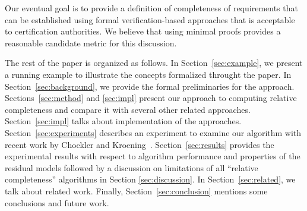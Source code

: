 \noindent Our eventual goal is to provide a definition of completeness of requirements that can be established using formal verification-based approaches that is acceptable to certification authorities.  We believe that using minimal proofs provides a reasonable candidate metric for this discussion.


The rest of the paper is organized as follows.  In Section~\ref{sec:example}, we present a running example to illustrate the concepts formalized throught the paper.  In Section~\ref{sec:background}, we provide the formal preliminaries for the approach.  Sections~\ref{sec:method} and \ref{sec:impl} present our approach to computing relative completeness and compare it with several other related approaches. Section~\ref{sec:impl} talks about implementation of the approaches. Section~\ref{sec:experiments} describes an experiment to examine our algorithm with recent work by Chockler and Kroening~\cite{chockler2010coverage}. Section~\ref{sec:results} provides the experimental results with respect to algorithm performance and properties of the residual models followed by a discussion on limitations of all ``relative completeness'' algorithms in Section \ref{sec:discussion}.  In Section~\ref{sec:related}, we talk about related work.  Finally, Section~\ref{sec:conclusion} mentions some conclusions and future work.

